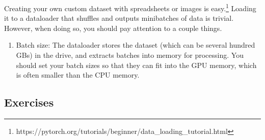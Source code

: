 \documentclass{article}
\begin{document}
    Creating your own custom dataset with spreadsheets or images is easy.\footnote{https://pytorch.org/tutorials/beginner/data\_loading\_tutorial.html} Loading it to a dataloader that shuffles and outputs minibatches of data is trivial. However, when doing so, you should pay attention to a couple things. 
    \begin{enumerate} 
      \item Batch size: The dataloader stores the dataset (which can be several hundred GBs) in the drive, and extracts batches into memory for processing. You should set your batch sizes so that they can fit into the GPU memory, which is often smaller than the CPU memory. 
    \end{enumerate}

\subsection{Exercises} 
\end{document}
